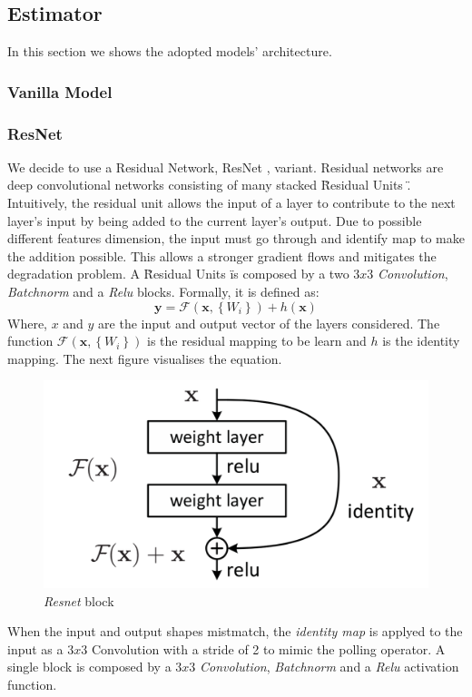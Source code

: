 \documentclass[../document.tex]{subfiles}
\begin{document}
\subsection{Estimator}
In this section we shows the adopted models' architecture.
\subsubsection{Vanilla Model}
\subsubsection{ResNet}
We decide to use a Residual Network, ResNet \cite{he2015deep}, variant. Residual networks are deep convolutional
networks consisting of many stacked \" Residual Units \". Intuitively, the residual unit allows the input of a layer to contribute to the next layer's input by being added to the current layer's output. Due to possible different features dimension, the input must go through and identify map to make the addition possible. This allows a stronger gradient flows and mitigates the degradation problem. A \"Residual Units \" is composed by a two $3x3$ \emph{Convolution}, \emph{Batchnorm} \cite{ioffe2015batch} and a \emph{Relu} blocks. Formally, it is defined as: 
\begin{equation}
    \mathbf{y}=\mathcal{F}\left(\mathbf{x},\left\{W_{i}\right\}\right)+h(\mathbf{x})
    \label{eq : resnet}
\end{equation}
Where, $x$ and $y$ are the input and output vector of the layers considered. The function $\mathcal{F}\left(\mathbf{x},\left\{W_{i}\right\}\right)$ is the residual mapping to be learn and $h$ is the identity mapping. The next figure visualises the equation.

\begin{figure}[H]
    \centering
    \includegraphics[scale=0.3]{../img/implementation/estimator/resnet_block.png}
    \caption{\emph{Resnet} block \cite{he2015deep}}
\end{figure}
When the input and output shapes mistmatch, the \emph{identity map} is applyed to the input as a $3x3$ Convolution with a stride of 2 to mimic the polling operator. A single block is composed by a $3x3$ \emph{Convolution}, \emph{Batchnorm} and a \emph{Relu} activation function. 
\end{document}
